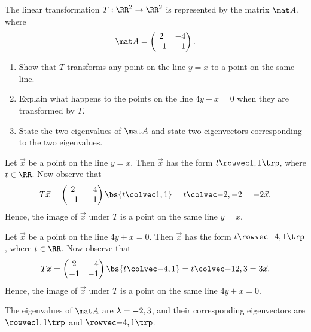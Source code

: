 \begin{problem}
    The linear transformation $T : \RR^2 \to \RR^2$ is represented by the matrix $\mat A$, where \[\mat A = \begin{pmatrix}2 & -4 \\ -1 & -1\end{pmatrix}.\]

    \begin{enumerate}
        \item Show that $T$ transforms any point on the line $y = x$ to a point on the same line.
        \item Explain what happens to the points on the line $4y + x = 0$ when they are transformed by $T$.
        \item State the two eigenvalues of $\mat A$ and state two eigenvectors corresponding to the two eigenvalues.
    \end{enumerate}
\end{problem}
\begin{solution}
    \begin{ppart}
        Let $\vec x$ be a point on the line $y = x$. Then $\vec x$ has the form $t \cveciix11$, where $t \in \RR$. Now observe that \[T \vec x = \begin{pmatrix}2 & -4 \\ -1 & -1\end{pmatrix} \bs{t\cvecii11} = t \cvecii{-2}{-2} = -2\vec x.\] Hence, the image of $\vec x$ under $T$ is a point on the same line $y = x$.
    \end{ppart}
    \begin{ppart}
        Let $\vec x$ be a point on the line $4y + x = 0$. Then $\vec x$ has the form $t \cveciix{-4}1$, where $t \in \RR$. Now observe that \[T \vec x = \begin{pmatrix}2 & -4 \\ -1 & -1\end{pmatrix} \bs{t\cvecii{-4}1} = t \cvecii{-12}{3} = 3\vec x.\] Hence, the image of $\vec x$ under $T$ is a point on the same line $4y + x = 0$.
    \end{ppart}
    \begin{ppart}
        The eigenvalues of $\mat A$ are $\lambda = -2, 3$, and their corresponding eigenvectors are $\cveciix11$ and $\cveciix{-4}1$.
    \end{ppart}
\end{solution}

